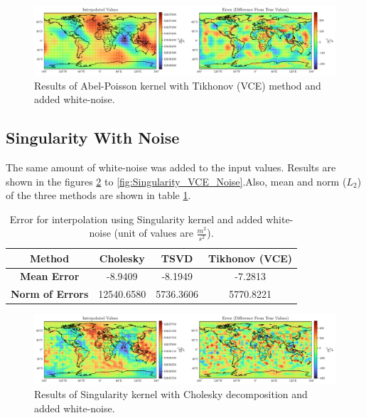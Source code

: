 \documentclass[12pt]{article}
\begin{document}
	\begin{figure}[h!]
		\centering
		\includegraphics[width=16cm]{../Outputs/AbelPoisson_VCE_Noise.pdf}
		\caption{Results of Abel-Poisson kernel with Tikhonov (VCE) method and added white-noise.}
		\label{fig:AbelPoisson_VCE_Noise}
	\end{figure}
	
	
	\subsection{Singularity With Noise}
	
	The same amount of white-noise was added to the input values. Results are shown in the figures \ref{fig:Singularity_Chol_Noise} to \ref{fig:Singularity_VCE_Noise}.Also, mean and norm ($L_2$) of the three methods are shown in table \ref{tab:Singularity_Error_Noise}.
	
	\begin{table}[h!]
		\centering
		\caption{Error for interpolation using Singularity kernel and added white-noise (unit of values are $\frac{m^2}{s^2}$).}
		\vspace{0.3cm}
		\renewcommand{\arraystretch}{1.4}
		\begin{tabular}{c|c|c|c}
			\textbf{Method} & Cholesky & TSVD & Tikhonov (VCE) \\
			\hline 
			\textbf{Mean Error} & -8.9409 & -8.1949 & -7.2813 \\
			\hline 
			\textbf{Norm of Errors} & 12540.6580 & 5736.3606 & 5770.8221 \\
		\end{tabular}
		\label{tab:Singularity_Error_Noise}
	\end{table}
	
	\begin{figure}[h!]
		\centering
		\includegraphics[width=16cm]{../Outputs/Singularity_Cholesky_Noise.pdf}
		\caption{Results of Singularity kernel with Cholesky decomposition and added white-noise.}
		\label{fig:Singularity_Chol_Noise}
	\end{figure}
	
\end{document}

